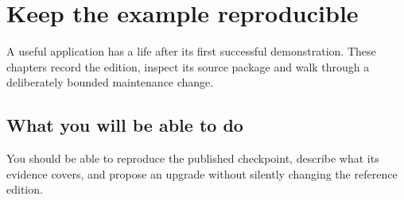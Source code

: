 \chapter*{Keep the example reproducible}

A useful application has a life after its first successful demonstration. These chapters record the edition, inspect its source package and walk through a deliberately bounded maintenance change.

\section*{What you will be able to do}

You should be able to reproduce the published checkpoint, describe what its evidence covers, and propose an upgrade without silently changing the reference edition.
